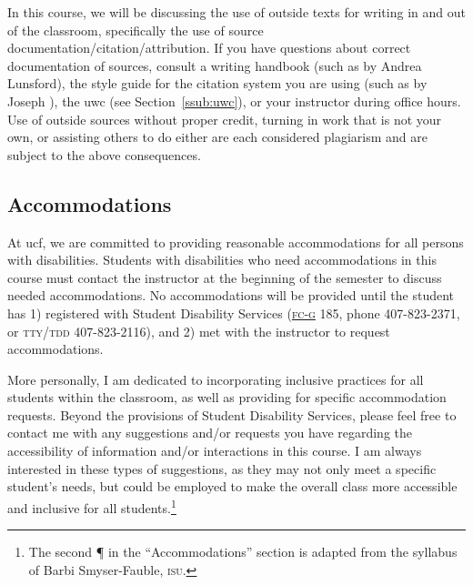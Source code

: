 \documentclass[11pt, twosides]{amsart}	%
\begin{document}
In this course, we will be discussing the use of outside texts for writing in and out of the classroom, specifically the use of source documentation/citation/attribution. If you have questions about correct documentation of sources, consult a writing handbook (such as  by Andrea Lunsford), the style guide for the citation system you are using (such as  by Joseph \citeauthor{gibaldi:2009aa}), the \ac{uwc} (see Section~\ref{ssub:uwc}), or your instructor during office hours. Use of outside sources without proper credit, turning in work that is not your own, or assisting others to do either are each considered plagiarism and are subject to the above consequences.

\subsection{Accommodations}
At \ac{ucf}, we are committed to providing reasonable accommodations for all persons with disabilities. Students with disabilities who need accommodations in this course must contact the instructor at the beginning of the semester to discuss needed accommodations. No accommodations will be provided until the student has 1) registered with Student Disability Services (\href{http://map.ucf.edu/locations/7g/ferrell-commons-g-fc-g/}{\textsc{fc-g}} 185, phone 407-823-2371, or \textsc{tty/tdd} 407-823-2116), and 2) met with the instructor to request accommodations.

More personally, I am dedicated to incorporating inclusive practices for all students within the classroom, as well as providing for specific accommodation requests. Beyond the provisions of Student Disability Services, please feel free to contact me with any suggestions and/or requests you have regarding the accessibility of information and/or interactions in this course. I am always interested in these types of suggestions, as they may not only meet a specific student's needs, but could be employed to make the overall class more accessible and inclusive for all students.\footnote{The second ¶ in the ``Accommodations'' section is adapted from the syllabus of Barbi Smyser-Fauble, \textsc{isu}.}
\end{document}
